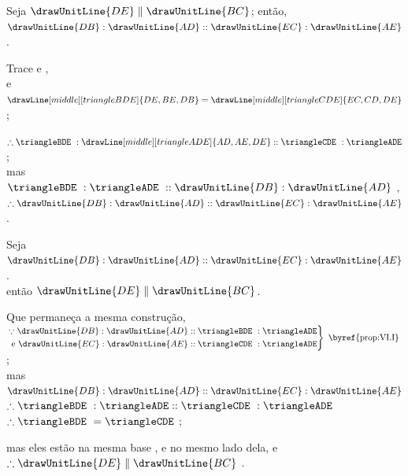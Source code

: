 \documentclass[booklanguage=brazilian]{byrnebook}
\begin{document}
\drawCurrentPictureInMargin
{}

\begin{center}
Seja $\drawUnitLine{DE} \parallel \drawUnitLine{BC}$; então,\\
$\drawUnitLine{DB} : \drawUnitLine{AD} :: \drawUnitLine{EC} : \drawUnitLine{AE}$.

Trace  e ,\\
e
$\drawLine[middle][triangleBDE]{DE,BE,DB}
=
\drawLine[middle][triangleCDE]{EC,CD,DE}$ ;

$\therefore \triangleBDE\ :
\drawLine[middle][triangleADE]{AD,AE,DE} :: \triangleCDE\ : \triangleADE$ ;\\
mas $\triangleBDE\ : \triangleADE\ :: \drawUnitLine{DB} : \drawUnitLine{AD}$ ,\\
$\therefore \drawUnitLine{DB} : \drawUnitLine{AD} :: \drawUnitLine{EC} : \drawUnitLine{AE}$ .
\end{center}

\vfill\pagebreak

\begin{center}
Seja $\drawUnitLine{DB} : \drawUnitLine{AD} :: \drawUnitLine{EC} : \drawUnitLine{AE}$.\\
então $\drawUnitLine{DE} \parallel \drawUnitLine{BC}$.

Que permaneça a mesma construção,\\
$\left.
\begin{aligned}
\because \drawUnitLine{DB} : \drawUnitLine{AD} &:: \triangleBDE\ : \triangleADE \\ %
\mbox{ e } \drawUnitLine{EC} : \drawUnitLine{AE} &:: \triangleCDE\ : \triangleADE \\
\end{aligned}
\right\}\mbox{ \byref{prop:VI.I} }$;\\
mas $\drawUnitLine{DB} : \drawUnitLine{AD} :: \drawUnitLine{EC} : \drawUnitLine{AE}$ \byref{\hypref}\\
$\therefore \triangleBDE\ : \triangleADE :: \triangleCDE\ : \triangleADE$ \\
$\therefore \triangleBDE\ = \triangleCDE$ ;

mas eles estão na mesma base , e no mesmo lado dela, e\\
$\therefore \drawUnitLine{DE} \parallel \drawUnitLine{BC}$ .
\end{center}
\end{document}
